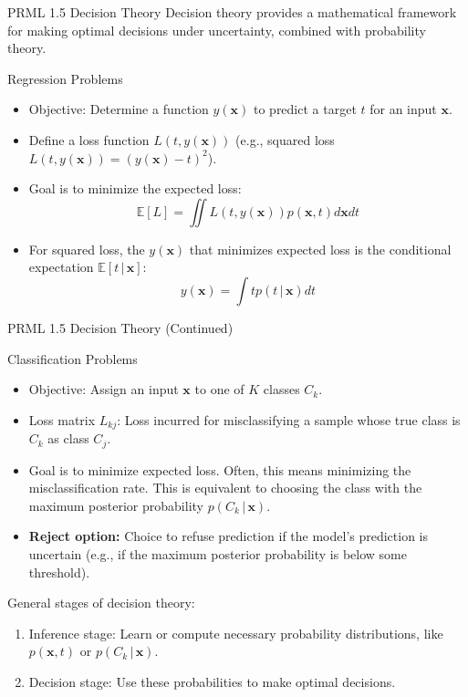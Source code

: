 \documentclass{beamer} %
\newcommand{\vect}[1]{\mathbf{#1}}
\newcommand{\given}{\,|\,}
\begin{document}
\begin{frame}{PRML 1.5 Decision Theory}
  Decision theory provides a mathematical framework for making optimal decisions under uncertainty, combined with probability theory.
  \begin{block}{Regression Problems}
    \begin{itemize}
      \item Objective: Determine a function $y(\vect{x})$ to predict a target $t$ for an input $\vect{x}$.
      \item Define a loss function $L(t, y(\vect{x}))$ (e.g., squared loss $L(t, y(\vect{x})) = (y(\vect{x}) - t)^2$).
      \item Goal is to minimize the expected loss:
        \begin{equation*}
          \mathbb{E}[L] = \iint L(t, y(\vect{x})) p(\vect{x}, t) d\vect{x} dt
        \end{equation*}
      \item For squared loss, the $y(\vect{x})$ that minimizes expected loss is the conditional expectation $\mathbb{E}[t \given \vect{x}]$:
        \begin{equation*}
         y(\vect{x}) = \int t p(t \given \vect{x}) dt
        \end{equation*}
    \end{itemize}
  \end{block}
\end{frame}

\begin{frame}{PRML 1.5 Decision Theory (Continued)}
  \begin{block}{Classification Problems}
  \begin{itemize}
    \item Objective: Assign an input $\vect{x}$ to one of $K$ classes $C_k$.
    \item Loss matrix $L_{kj}$: Loss incurred for misclassifying a sample whose true class is $C_k$ as class $C_j$.
    \item Goal is to minimize expected loss. Often, this means minimizing the misclassification rate.
      This is equivalent to choosing the class with the maximum posterior probability $p(C_k \given \vect{x})$.
    \item \textbf{Reject option:} Choice to refuse prediction if the model's prediction is uncertain (e.g., if the maximum posterior probability is below some threshold).
  \end{itemize}
  \end{block}
  \vspace{0.5em}
  General stages of decision theory:
  \begin{enumerate}
      \item Inference stage: Learn or compute necessary probability distributions, like $p(\vect{x},t)$ or $p(C_k \given \vect{x})$.
      \item Decision stage: Use these probabilities to make optimal decisions.
  \end{enumerate}
\end{frame}
\end{document}

